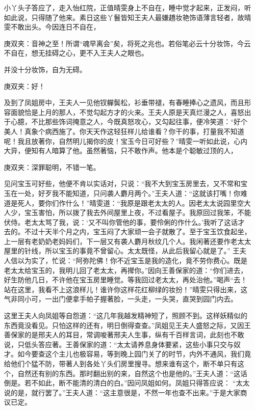 \begin{parag}
    小丫头子答应了，走入怡红院，正值晴雯身上不自在，睡中觉才起来，正发闷，听如此说，只得随了他来。素日这些丫鬟皆知王夫人最嫌趫妆艳饰语薄言轻者，故晴雯不敢出头。今因连日不自在，\begin{note}庚双夹：音神之至！所谓“魂早离会”矣，将死之兆也。若俗笔必云十分妆饰，今云不自在，想无挂碍之心，更不入王夫人之眼也。\end{note}并没十分妆饰，自为无碍。\begin{note}庚双夹：好！\end{note}及到了凤姐房中，王夫人一见他钗軃鬓松，衫垂带褪，有春睡捧心之遗风，而且形容面貌恰是上月的那人，不觉勾起方才的火来。王夫人原是天真烂漫之人，喜怒出于心臆，不比那些饰词掩意之人，今既真怒攻心，又勾起往事，便冷笑道：“好个美人！真象个病西施了。你天天作这轻狂样儿给谁看？你干的事，打量我不知道呢！我且放著你，自然明儿揭你的皮！宝玉今日可好些？”晴雯一听如此说，心内大异，便知有人暗算了他。虽然著恼，只不敢作声。他本是个聪敏过顶的人，\begin{note}庚双夹：深罪聪明，不错一笔。\end{note}见问宝玉可好些，他便不肯以实话对，只说：“我不大到宝玉房里去，又不常和宝玉在一处，好歹我不能知道，只问袭人麝月两个。”王夫人道：“这就该打嘴！你难道是死人，要你们作什么！”晴雯道：“我原是跟老太太的人。因老太太说园里空大人少，宝玉害怕，所以拨了我去外间屋里上夜，不过看屋子。我原回过我笨，不能伏侍。老太太骂了我，说：‘又不叫你管他的事，要伶俐的作什么。’我听了这话才去的。不过十天半个月之内，宝玉闷了大家顽一会子就散了。至于宝玉饮食起坐，上一层有老奶奶老妈妈们，下一层又有袭人麝月秋纹几个人。我闲著还要作老太太屋里的针线，所以宝玉的事竟不曾留心。太太既怪，从此后我留心就是了。” 王夫人信以为实了，忙说：“阿弥陀佛！你不近宝玉是我的造化，竟不劳你费心。既是老太太给宝玉的，我明儿回了老太太，再撵你。”因向王善保家的道：“你们进去，好生防他几日，不许他在宝玉房里睡觉。等我回过老太太，再处治他。”喝声“去！站在这里，我看不上这浪样儿！谁许你这样花红柳绿的妆扮！”晴雯只得出来，这气非同小可，一出门便拿手帕子握著脸，一头走，一头哭，直哭到园门内去。
\end{parag}


\begin{parag}
    这里王夫人向凤姐等自怨道：“这几年我越发精神短了，照顾不到。这样妖精似的东西竟没看见。只怕这样的还有，明日倒得查查。”凤姐见王夫人盛怒之际，又因王善保家的是邢夫人的耳目，常调唆著邢夫人生事，纵有千百样言词，此刻也不敢说，只低头答应著。王善保家的道：“太太请养息身体要紧，这些小事只交与奴才。如今要查这个主儿也极容易，等到晚上园门关了的时节，内外不通风，我们竟给他们个猛不防，带著人到各处丫头们房里搜寻。想来谁有这个，断不单只有这个，自然还有别的东西。那时翻出别的来，自然这个也是他的。”王夫人道：“这话倒是。若不如此，断不能清的清白的白。”因问凤姐如何。凤姐只得答应说： “太太说的是，就行罢了。”王夫人道：“这主意很是，不然一年也查不出来。”于是大家商议已定。
\end{parag}


